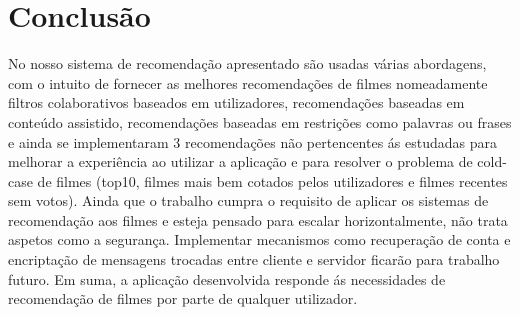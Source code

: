 \section{Conclusão}

No nosso sistema de recomendação apresentado são usadas várias abordagens, com o intuito de fornecer as melhores recomendações de filmes nomeadamente filtros colaborativos baseados em utilizadores, recomendações baseadas em conteúdo assistido, recomendações baseadas em restrições como palavras ou frases e ainda se implementaram 3 recomendações não pertencentes ás estudadas para melhorar a experiência ao utilizar a aplicação e para resolver o problema de cold-case de filmes (top10, filmes mais bem cotados pelos utilizadores e filmes recentes sem votos).
Ainda que o trabalho cumpra o requisito de aplicar os sistemas de recomendação aos filmes e esteja pensado para escalar horizontalmente, não trata aspetos como a segurança. Implementar mecanismos como recuperação de conta e encriptação de mensagens trocadas entre cliente e servidor ficarão para trabalho futuro.
Em suma, a aplicação desenvolvida responde ás necessidades de recomendação de filmes por parte de qualquer utilizador.